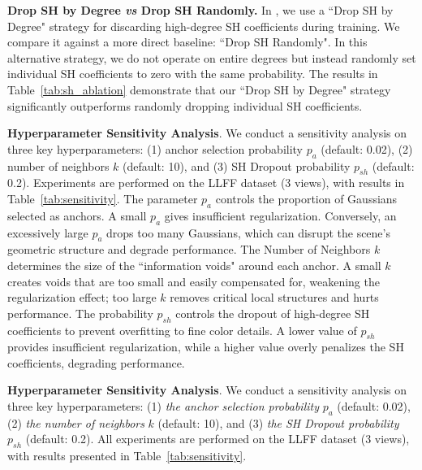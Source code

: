 \vspace{1mm}
\noindent\textbf{Drop SH by Degree \textit{vs} Drop SH Randomly.}
In \methodname{}, we use a ``Drop SH by Degree" strategy for discarding high-degree SH coefficients during training. 
%
We compare it against a more direct baseline: ``Drop SH Randomly". In this alternative strategy, we do not operate on entire degrees but instead randomly set individual SH coefficients to zero with the same probability.
%
The results in Table~\ref{tab:sh_ablation} demonstrate that our ``Drop SH by Degree" strategy significantly outperforms randomly dropping individual SH coefficients. 



\vspace{1mm}
\noindent\textbf{Hyperparameter Sensitivity Analysis}.
We conduct a sensitivity analysis on three key hyperparameters: (1) anchor selection probability $p_a$ (default: 0.02), (2) number of neighbors $k$ (default: 10), and (3) SH Dropout probability $p_{sh}$ (default: 0.2). Experiments are performed on the LLFF dataset (3 views), with results in Table~\ref{tab:sensitivity}.
%
The parameter $p_a$ controls the proportion of Gaussians selected as anchors. A small $p_a$ gives insufficient regularization. Conversely, an excessively large $p_a$ drops too many Gaussians, which can disrupt the scene's geometric structure and degrade performance.
%
The Number of Neighbors $k$ determines the size of the ``information voids" around each anchor.
A small $k$ creates voids that are too small and easily compensated for, weakening the regularization effect; too large $k$ removes critical local structures and hurts performance.
%
The probability $p_{sh}$ controls the dropout of high-degree SH coefficients to prevent overfitting to fine color details. A lower value of $p_{sh}$ provides insufficient regularization, while a higher value overly penalizes the SH coefficients, degrading performance.



























\iffalse

\noindent\textbf{Hyperparameter Sensitivity Analysis}.
We conduct a sensitivity analysis on three key hyperparameters: (1) \textit{the anchor selection probability} $p_a$ (default: 0.02), (2) \textit{the number of neighbors} $k$ (default: 10), and (3) \textit{the SH Dropout probability} $p_{sh}$ (default: 0.2). All experiments are performed on the LLFF dataset (3 views), with results presented in Table~\ref{tab:sensitivity}.

